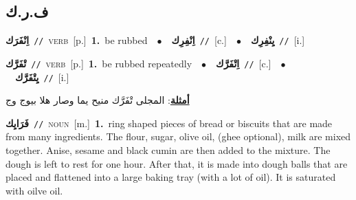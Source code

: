 \documentclass[10pt,a4paper,twoside]{article} %
\begin{document}
\begin{multicols}{2}
\vspace{-3mm}
\subsection*{\color{blue}\foreignlanguage{arabic}{ف.ر.ك}\color{blue}{}} 

{\setlength\topsep{0pt}\textbf{\foreignlanguage{arabic}{اِنْفَرَك}}\ {\color{gray}\texttt{//}\color{black}}\ \textsc{verb}\ [p.]\ \textbf{1.}~be rubbed\ \ $\bullet$\ \ \setlength\topsep{0pt}\textbf{\foreignlanguage{arabic}{اِنْفِرِك}}\ {\color{gray}\texttt{//}\color{black}}\ [c.]\ \ $\bullet$\ \ \setlength\topsep{0pt}\textbf{\foreignlanguage{arabic}{يِنْفِرِك}}\ {\color{gray}\texttt{//}\color{black}}\ [i.]\ } \vspace{2mm}

{\setlength\topsep{0pt}\textbf{\foreignlanguage{arabic}{تْفَرَّك}}\ {\color{gray}\texttt{//}\color{black}}\ \textsc{verb}\ [p.]\ \textbf{1.}~be rubbed repeatedly\ \ $\bullet$\ \ \setlength\topsep{0pt}\textbf{\foreignlanguage{arabic}{اِتْفَرَّك}}\ {\color{gray}\texttt{//}\color{black}}\ [c.]\ \ $\bullet$\ \ \setlength\topsep{0pt}\textbf{\foreignlanguage{arabic}{يِتْفَرَّك}}\ {\color{gray}\texttt{//}\color{black}}\ [i.]\  \begin{flushright}\color{gray}\foreignlanguage{arabic}{\textbf{\underline{\foreignlanguage{arabic}{أمثلة}}}: المجلى تْفَرَّك منيح يما وصار هلا بيوج وج}\end{flushright}\color{black}} \vspace{2mm}

{\setlength\topsep{0pt}\textbf{\foreignlanguage{arabic}{فَرَايِك}}\ {\color{gray}\texttt{//}\color{black}}\ \textsc{noun}\ [m.]\ \textbf{1.}~ring shaped pieces of bread or biscuits that are made from many ingredients. The flour, sugar, olive oil, (ghee optional), milk are mixed together. Anise, sesame and black cumin are then added to the mixture. The dough is left to rest for one hour. After that, it is made into dough balls that are placed and flattened into a large baking tray (with a lot of oil). It is saturated with oilve oil.\ } \vspace{2mm}


\end{multicols}
\end{document}
